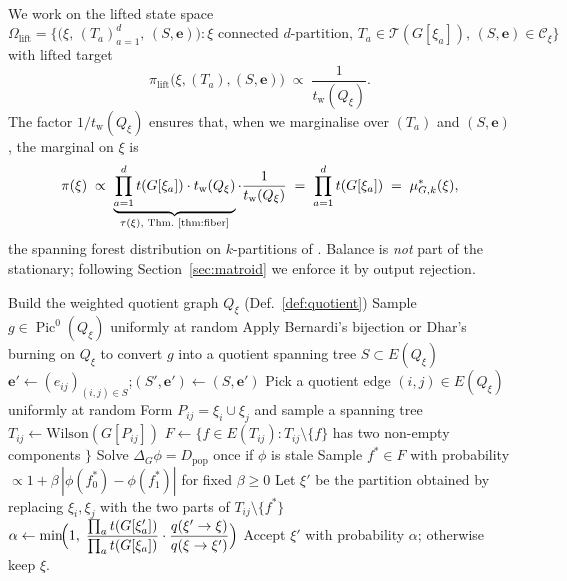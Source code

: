 \documentclass[11pt]{article}
\newcommand{\Pic}{\operatorname{Pic}^0}
\newcommand{\tw}{t_{\mathrm{w}}}
\begin{document}
We work on the lifted state space
\[
  \Omega_{\mathrm{lift}} = \bigl\{ \bigl(\xi,\, (T_a)_{a=1}^d,\, (S, \mathbf{e})\bigr) :
  \xi \text{ connected $d$-partition},\, T_a \in \mathcal{T}(G[\xi_a]),\, (S, \mathbf{e}) \in \mathcal{C}_\xi \bigr\}
\]
with lifted target
\[
  \pi_{\mathrm{lift}}\bigl(\xi,(T_a),(S,\mathbf{e})\bigr) \;\propto\;
  \frac{1}{\tw(Q_\xi)}.
\]
The factor $1/\tw(Q_\xi)$ ensures that, when we marginalise over
$(T_a)$ and $(S, \mathbf{e})$, the marginal on $\xi$ is
\[
  \pi(\xi) \;\propto\;
  \underbrace{\prod_{a=1}^d t(G[\xi_a]) \cdot \tw(Q_\xi)}_{\tau(\xi),\text{ Thm.~\ref{thm:fiber}}} \cdot \frac{1}{\tw(Q_\xi)} \;=\;
  \prod_{a=1}^d t(G[\xi_a]) \;=\; \mu^*_{G,k}(\xi),
\]
the spanning forest distribution on $k$-partitions of
\cite{charikar2023complexity}. Balance is \emph{not} part of the
stationary; following Section~\ref{sec:matroid} we enforce it by output
rejection.

\begin{algorithm}[H]
\caption{Picard-Quotient Block Sampler (one step)}\label{alg:pqbs}
\BlankLine
{}
\BlankLine
{}
Build the weighted quotient graph $Q_\xi$ (Def.~\ref{def:quotient})\;
Sample $g \in \Pic(Q_\xi)$ uniformly at random\;
Apply Bernardi's bijection or Dhar's burning on $Q_\xi$ to convert $g$ into
a quotient spanning tree $S \subset E(Q_\xi)$\;
$\mathbf{e}' \gets (e_{ij})_{(i,j) \in S}$;\quad $(S', \mathbf{e}') \gets (S, \mathbf{e}')$\;
\BlankLine
{}
Pick a quotient edge $(i,j) \in E(Q_\xi)$ uniformly at random\;
Form $P_{ij} = \xi_i \cup \xi_j$ and sample a spanning tree
$T_{ij} \gets \mathrm{Wilson}(G[P_{ij}])$\;
$F \gets \{ f \in E(T_{ij}) : T_{ij} \setminus \{f\}$ has two non-empty components $\}$\;
Solve $\Delta_G \phi = D_{\mathrm{pop}}$ once if $\phi$ is stale\;
Sample $f^* \in F$ with probability $\propto 1 + \beta\,|\phi(f^*_0) - \phi(f^*_1)|$ for fixed $\beta \geq 0$\;
Let $\xi'$ be the partition obtained by replacing $\xi_i, \xi_j$ with the
two parts of $T_{ij} \setminus \{f^*\}$\;
$\alpha \gets \min\!\Bigl(1,\;
  \dfrac{\prod_a t(G[\xi'_a])}{\prod_a t(G[\xi_a])} \cdot
  \dfrac{q(\xi' \to \xi)}{q(\xi \to \xi')}\Bigr)$
Accept $\xi'$ with probability $\alpha$; otherwise keep $\xi$.
\end{algorithm}
\end{document}
